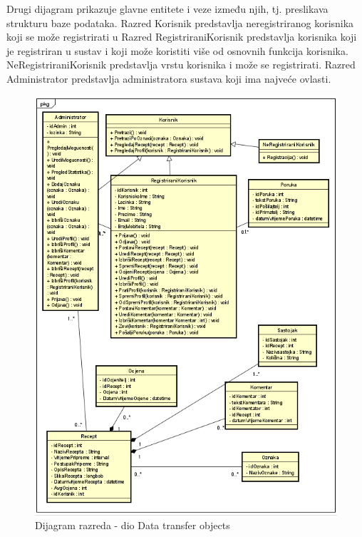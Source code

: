 		Drugi dijagram prikazuje glavne entitete i veze između njih, 
		tj. preslikava strukturu baze podataka. Razred Korisnik 
		predstavlja neregistriranog korisnika koji se može registrirati 
		u Razred RegistriraniKorisnik predstavlja korisnika koji je registriran u sustav 
		i koji može koristiti više od osnovnih funkcija korisnika. NeRegistriraniKorisnik predstavlja vrstu korisnika i može se registrirati.
		Razred Administrator predstavlja administratora sustava koji ima najveće ovlasti. 



		\begin{figure}[H]
			\includegraphics[scale=1.3]{slike/dijagram_razreda1.png} %
			\centering
			\caption{Dijagram razreda - dio Data transfer objects}
			\label{fig:Dijagram_razreda1}
		\end{figure}
			
